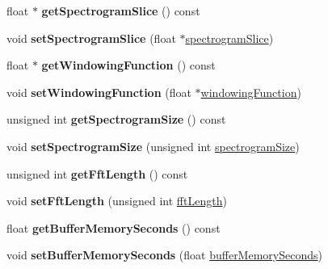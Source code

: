 \begin{DoxyCompactItemize}
float $\ast$ {\bfseries get\+Spectrogram\+Slice} () const
\item 
\hypertarget{classAudioInput_a55f5b0061a542195af4161c5ef931d2b}{}\label{classAudioInput_a55f5b0061a542195af4161c5ef931d2b} 
void {\bfseries set\+Spectrogram\+Slice} (float $\ast$\hyperlink{classAudioInput_aa277accc3be5054fe8439ac7086deaf5}{spectrogram\+Slice})
\item 
\hypertarget{classAudioInput_ac7a550e7e3d4312b576978df832d70ec}{}\label{classAudioInput_ac7a550e7e3d4312b576978df832d70ec} 
float $\ast$ {\bfseries get\+Windowing\+Function} () const
\item 
\hypertarget{classAudioInput_a4c11f1a37408349ee4d7354e1c2fdd11}{}\label{classAudioInput_a4c11f1a37408349ee4d7354e1c2fdd11} 
void {\bfseries set\+Windowing\+Function} (float $\ast$\hyperlink{classAudioInput_a72417120c208d81359f5b1205fc06664}{windowing\+Function})
\item 
\hypertarget{classAudioInput_afa340ece9b45d8d4bb85972edfe9712b}{}\label{classAudioInput_afa340ece9b45d8d4bb85972edfe9712b} 
unsigned int {\bfseries get\+Spectrogram\+Size} () const
\item 
\hypertarget{classAudioInput_a900f80fe37d48bc77d99cc0971f01ea7}{}\label{classAudioInput_a900f80fe37d48bc77d99cc0971f01ea7} 
void {\bfseries set\+Spectrogram\+Size} (unsigned int \hyperlink{classAudioInput_a1d4982a84d2e2e3d8a6b0f0fcdd4820e}{spectrogram\+Size})
\item 
\hypertarget{classAudioInput_a069f76d3553328428959325c1be3ee3e}{}\label{classAudioInput_a069f76d3553328428959325c1be3ee3e} 
unsigned int {\bfseries get\+Fft\+Length} () const
\item 
\hypertarget{classAudioInput_a71e1759bc4267b436bd9b4b8937dcabd}{}\label{classAudioInput_a71e1759bc4267b436bd9b4b8937dcabd} 
void {\bfseries set\+Fft\+Length} (unsigned int \hyperlink{classAudioInput_a5b31598e9106da62d86d11d69a9dbd20}{fft\+Length})
\item 
\hypertarget{classAudioInput_a547f6144fe074436c678776f647dcf02}{}\label{classAudioInput_a547f6144fe074436c678776f647dcf02} 
float {\bfseries get\+Buffer\+Memory\+Seconds} () const
\item 
\hypertarget{classAudioInput_a2ac6cfeb9f0d289cb5170d03a07472ef}{}\label{classAudioInput_a2ac6cfeb9f0d289cb5170d03a07472ef} 
void {\bfseries set\+Buffer\+Memory\+Seconds} (float \hyperlink{classAudioInput_aea3145ccca0f7cebf36a78278ca44031}{buffer\+Memory\+Seconds})
\item 
\hypertarget{classAudioInput_a2b531eed74caeceff65deed019976804}{}\label{classAudioInput_a2b531eed74caeceff65deed019976804} 

\end{DoxyCompactItemize}
